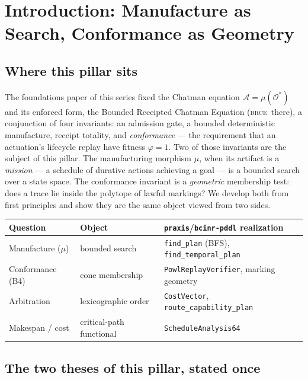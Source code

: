 \documentclass[11pt,oneside]{book}
\theoremstyle{definition}
\theoremstyle{plain}
\theoremstyle{remark}
\newcommand{\Adm}{\mathcal{O}^{*}}             %
\newcommand{\Act}{\mathcal{A}}                 %
\newcommand{\muop}{\mu}                        %
\newcommand{\Fitness}{\varphi}
\newcommand{\BRCE}{\textsc{brce}}              %
\newcommand{\code}[1]{\texttt{#1}}
\begin{document}
\tableofcontents

\mainmatter

\chapter{Introduction: Manufacture as Search, Conformance as Geometry}
\label{ch:intro}

\section{Where this pillar sits}

The foundations paper of this series fixed the Chatman equation $\Act=\muop(\Adm)$ and its
enforced form, the Bounded Receipted Chatman Equation (\BRCE\ there), a conjunction of four
invariants: an admission gate, a bounded deterministic manufacture, receipt totality, and
\emph{conformance} --- the requirement that an actuation's lifecycle replay have fitness
$\Fitness=1$. Two of those invariants are the subject of this pillar. The manufacturing
morphism $\muop$, when its artifact is a \emph{mission} --- a schedule of durative actions
achieving a goal --- is a bounded search over a state space. The conformance invariant is a
\emph{geometric} membership test: does a trace lie inside the polytope of lawful markings? We
develop both from first principles and show they are the same object viewed from two sides.

\begin{center}
\begin{tabular}{lll}
\toprule
Question & Object & \code{praxis}/\code{bcinr-pddl} realization\\
\midrule
Manufacture ($\muop$) & bounded search & \code{find\_plan} (BFS), \code{find\_temporal\_plan}\\
Conformance (B4) & cone membership & \code{PowlReplayVerifier}, marking geometry\\
Arbitration & lexicographic order & \code{CostVector}, \code{route\_capability\_plan}\\
Makespan / cost & critical-path functional & \code{ScheduleAnalysis64}\\
\bottomrule
\end{tabular}
\end{center}

\section{The two theses of this pillar, stated once}
\end{document}
